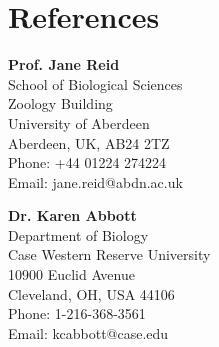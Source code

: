 \documentclass[letterpaper]{article}
\renewenvironment{itemize}{
  \begin{list}{}{
    \setlength{\leftmargin}{1.5em}
  }
}{
  \end{list}
}
\begin{document}

\section*{References}

\begin{minipage}{0.5\linewidth}

\begin{itemize}
\item {\bf Prof. Jane Reid} \\
School of Biological Sciences \\
Zoology Building \\
University of Aberdeen \\
Aberdeen, UK, AB24 2TZ \\
Phone: +44 01224 274224 \\
Email: jane.reid@abdn.ac.uk \\

\item {\bf Dr. Karen Abbott} \\
Department of Biology \\
Case Western Reserve University \\
10900 Euclid Avenue \\
Cleveland, OH, USA 44106 \\
Phone: 1-216-368-3561 \\
Email: kcabbott@case.edu \\

\end{itemize}
\end{minipage}
\end{document}
